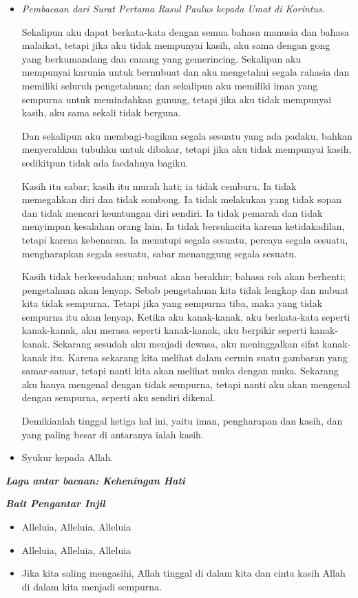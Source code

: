 \documentclass[10pt]{book}
\makeatletter
\newcommand{\lagu}[1]{%
  {\parindent \z@ \normalfont
    \interlinepenalty\@M \bfseries \emph{#1}\par\nobreak \vskip 20\p@ }}
\newcommand{\BU}[1]{\begin{itemize} \item[U:] #1 \end{itemize}}
\newcommand{\BI}[1]{\begin{itemize} \item[I:] #1 \end{itemize}}
\newcommand{\BP}[1]{\begin{itemize} \item[P:] #1 \end{itemize}}
\makeatother
\begin{document}
\BP{\emph{Pembacaan dari Surat Pertama Rasul Paulus kepada Umat di Korintus.}

Sekalipun aku dapat berkata-kata dengan semua bahasa manusia dan bahasa malaikat, tetapi jika aku tidak mempunyai kasih, aku sama dengan gong yang berkumandang dan canang yang gemerincing.
Sekalipun aku mempunyai karunia untuk bernubuat dan aku mengetahui segala rahasia dan memiliki seluruh pengetahuan; dan sekalipun aku memiliki iman yang sempurna untuk memindahkan gunung, tetapi jika aku tidak mempunyai kasih, aku sama sekali tidak berguna.

Dan sekalipun aku membagi-bagikan segala sesuatu yang ada padaku, bahkan menyerahkan tubuhku untuk dibakar, tetapi jika aku tidak mempunyai kasih, sedikitpun tidak ada faedahnya bagiku.

Kasih itu sabar; kasih itu murah hati; ia tidak cemburu. Ia tidak memegahkan diri dan tidak sombong.
Ia tidak melakukan yang tidak sopan dan tidak mencari keuntungan diri sendiri. Ia tidak pemarah dan tidak menyimpan kesalahan orang lain.
Ia tidak bersukacita karena ketidakadilan, tetapi karena kebenaran.
Ia menutupi segala sesuatu, percaya segala sesuatu, mengharapkan segala sesuatu, sabar menanggung segala sesuatu.

Kasih tidak berkesudahan; nubuat akan berakhir; bahasa roh akan berhenti; pengetahuan akan lenyap.
Sebab pengetahuan kita tidak lengkap dan nubuat kita tidak sempurna.
Tetapi jika yang sempurna tiba, maka yang tidak sempurna itu akan lenyap.
Ketika aku kanak-kanak, aku berkata-kata seperti kanak-kanak, aku merasa seperti kanak-kanak, aku berpikir seperti kanak-kanak. Sekarang sesudah aku menjadi dewasa, aku meninggalkan sifat kanak-kanak itu.
Karena sekarang kita melihat dalam cermin suatu gambaran yang samar-samar, tetapi nanti kita akan melihat muka dengan muka. Sekarang aku hanya mengenal dengan tidak sempurna, tetapi nanti aku akan mengenal dengan sempurna, seperti aku sendiri dikenal.

Demikianlah tinggal ketiga hal ini, yaitu iman, pengharapan dan kasih, dan yang paling besar di antaranya ialah kasih.}
\BU{Syukur kepada Allah.}

\lagu{Lagu antar bacaan: Keheningan Hati}

\lagu{Bait Pengantar Injil}

\BI{Alleluia, Alleluia, Alleluia} 

\BU{Alleluia, Alleluia, Alleluia} 

\BI{Jika kita saling mengasihi, Allah tinggal di dalam kita dan cinta kasih Allah di dalam kita menjadi sempurna.} 
	
\end{document}
